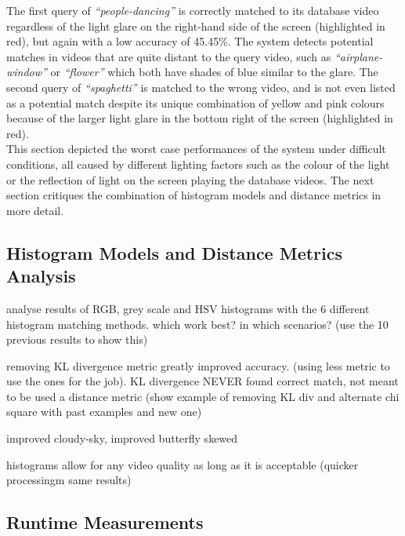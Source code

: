 The first query of \textit{``people-dancing''} is correctly matched to its database video regardless of the light glare on the right-hand side of the screen (highlighted in red), but again with a low accuracy of 45.45\%. The system detects potential matches in videos that are quite distant to the query video, such as \textit{``airplane-window''} or \textit{``flower''} which both have shades of blue similar to the glare. The second query of \textit{``spaghetti''} is matched to the wrong video, and is not even listed as a potential match despite its unique combination of yellow and pink colours because of the larger light glare in the bottom right of the screen (highlighted in red).\\

This section depicted the worst case performances of the system under difficult conditions, all caused by different lighting factors such as the colour of the light or the reflection of light on the screen playing the database videos. The next section critiques the combination of histogram models and distance metrics in more detail.


\subsection{Histogram Models and Distance Metrics Analysis}

analyse results of RGB, grey scale and HSV histograms with the 6 different histogram matching methods. which work best? in which scenarios? (use the 10 previous results to show this)

removing KL divergence metric greatly improved accuracy. (using less metric to use the ones for the job). KL divergence NEVER found correct match, not meant to be used a distance metric (show example of removing KL div and alternate chi square with past examples and new one)

improved cloudy-sky,
improved butterfly skewed

histograms allow for any video quality as long as it is acceptable (quicker processingm same results)


\subsection{Runtime Measurements}

